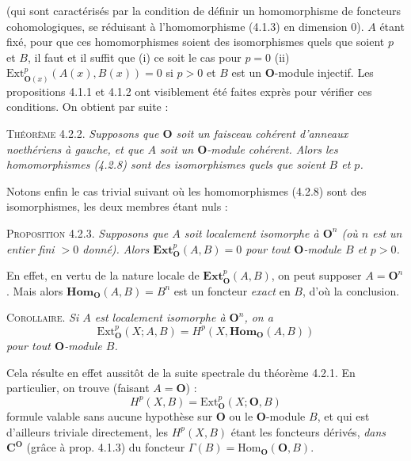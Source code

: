 \clearpage
{}

\noindent (qui sont caractérisés par la condition de définir un homomorphisme
de foncteurs cohomologiques, se réduisant à l'homomorphisme (4.1.3) en
dimension 0).
$A$ étant fixé, pour que ces homomorphismes soient des isomorphismes quels que
soient $p$ et $B$, il faut et il suffit que (i) ce soit le cas pour $p=0$
(ii) $\mathrm{Ext}_{{\mathbf O}(x)}^p(A(x),B(x))=0$ si $p>0$ et $B$ est un ${\mathbf O}$-module
injectif. Les propositions 4.1.1 et 4.1.2 ont visiblement été faites exprès
pour vérifier ces conditions. On obtient par suite :

\textsc{Théorème 4.2.2.} \textit{Supposons que ${\mathbf O}$ soit un faisceau
cohérent d'anneaux noethériens à gauche, et que $A$ soit un ${\mathbf O}$-module
cohérent. Alors les homomorphismes \textup{(4.2.8)} sont des isomorphismes quels que
soient $B$ et $p$.}

Notons enfin le cas trivial suivant où les homomorphismes (4.2.8) sont des
isomorphismes, les deux membres étant nuls :

\textsc{Proposition 4.2.3.} \textit{Supposons que $A$ soit localement
isomorphe à ${\mathbf O}^n$ \textup{(}où $n$ est un entier fini $>0$ donné\textup{)}. Alors
$\mathbf{Ext}_{\mathbf O}^p(A,B)=0$ pour tout ${\mathbf O}$-module $B$ et $p>0$.}

En effet, en vertu de la nature locale de $\mathbf{Ext}_{\mathbf O}^p(A,B)$, on peut
supposer $A={\mathbf O}^n$. Mais alors $\mathbf{Hom}_{\mathbf O}(A,B)=B^n$ est un foncteur
\textit{exact} en $B$, d'où la conclusion.

\textsc{Corollaire.} \textit{Si $A$ est localement isomorphe à
${\mathbf O}^n$, on a}
\[
\mathrm{Ext}_{\mathbf O}^p(X;A,B)=H^p(X,\mathbf{Hom}_{\mathbf O}(A,B))
\]
\textit{pour tout ${\mathbf O}$-module $B$.}

Cela résulte en effet aussitôt de la suite spectrale du théorème 4.2.1. En
particulier, on trouve (faisant $A={\mathbf O}$) :
\[
\tag{4.2.9}
H^p(X,B)=\mathrm{Ext}_{\mathbf O}^p(X;{\mathbf O},B)
\]
formule valable sans aucune hypothèse sur ${\mathbf O}$ ou le ${\mathbf O}$-module $B$, et qui est
d'ailleurs triviale directement, les $H^p(X,B)$ étant les foncteurs dérivés,
\textit{dans $\mathbf C^{\mathbf O}$} (grâce à prop. 4.1.3) du foncteur
$\Gamma(B)=\mathrm{Hom}_{\mathbf O}({\mathbf O},B)$.

